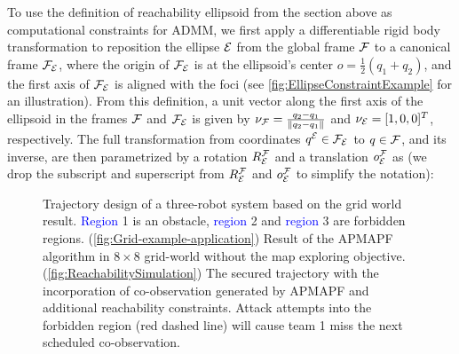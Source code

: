 \documentclass{article}
\newcommand{\new}[1]{\textcolor{blue}{#1}}
\begin{document}
\newcommand{\oFE}{o}
To use the definition of reachability ellipsoid from the section above as computational constraints for ADMM, we first apply a differentiable rigid body transformation to reposition the ellipse $\mathcal{E}$ from the global frame $\mathcal{F}$ to a canonical frame $\mathcal{F}_{\mathcal{E}}$, where the origin of $\mathcal{F}_{\mathcal{E}}$ is at the ellipsoid's center $\oFE = \frac{1}{2}(q_1+q_2)$, and the first axis of $\mathcal{F}_{\mathcal{E}}$ is aligned with the foci (see \cref{fig:EllipseConstraintExample} for an illustration). 
From this definition, a unit vector along the first axis of the ellipsoid in the frames $\mathcal{F}$ and $\mathcal{F}_{\mathcal{E}}$ is given by $\nu_{\mathcal{F}} = \frac{q_2-q_1}{\lVert q_2-q_1\rVert}$ and $\nu_{\mathcal{E}} =[1,0,0]^T$, respectively.
The full transformation from coordinates \new{$q^{\mathcal{E}}\in\mathcal{F}_{\mathcal{E}}$} to $q\in\mathcal{F}$, and its inverse, are then parametrized by a rotation $R^{\mathcal{F}}_{\mathcal{E}}$ and a translation $o^{\mathcal{F}}_{\mathcal{E}}$ as (we drop the subscript and superscript from $R^{\mathcal{F}}_{\mathcal{E}}$ and $o^{\mathcal{F}}_{\mathcal{E}}$ to simplify the notation):\setcounter{figure}{3}
\begin{figure}[h]
  \centering
  \caption{ Trajectory design of a three-robot system based on the grid world result. \new{Region} 1 is an obstacle, \new{region} 2 and \new{region} 3 are forbidden regions. (\ref{fig:Grid-example-application}) Result of the APMAPF algorithm in $8\times8$ grid-world without the map exploring objective. (\ref{fig:ReachabilitySimulation}) The secured trajectory with the incorporation of co-observation generated by APMAPF and additional reachability constraints. Attack attempts into the forbidden region (red dashed line) will cause team 1 miss the next scheduled co-observation.}
  \label{fig:example-application}
\end{figure}
\end{document}

